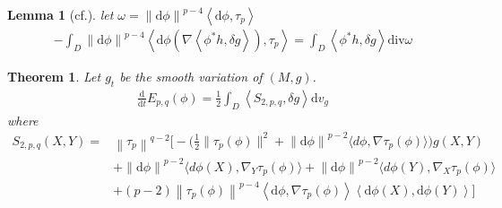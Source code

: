 \documentclass[12pt,UTF8]{article}
\theoremstyle{plain}
\newtheorem{thm}{Theorem}[section]
\newtheorem{lem}{Lemma}
\theoremstyle{definition}
\def\d {\mathrm{d}}
\def\div{\mathrm{div}}
\def\na{\ensuremath{\nabla}}
\renewcommand{\d}[1]{\mathbb{#1}}
\renewcommand{\(}{\left(}
\renewcommand{\)}{\right)}
\newcommand{\norm}[1]{\left\lVert#1\right\rVert}%
\numberwithin{equation}{subsection}
\def\na{\nabla}
\renewcommand{\div}{\mbox{div }}
\renewcommand{\(}{\left(}
\renewcommand{\)}{\right)}
\def\d{\mathrm{d}}
\def \d {\mathrm{d}}
\def \div{\mathrm{div}}
\numberwithin{equation}{section}
\begin{document}
\begin{lem}[cf.\cite{zbMATH06268870}]
	let $\omega=	\norm{\d \phi}^{p-4} \left\langle \d \phi,\tau_p \right\rangle$
	\begin{equation}
		\begin{split}
			-\int_D	\norm{\d \phi}^{p-4} \left\langle  \d \phi (\na \left\langle  \phi^*h,\delta g \right\rangle  ),\tau_p\right\rangle 
			=\int_D \left\langle \phi^*h,\delta g \right\rangle \div \omega
		\end{split}
	\end{equation}
\end{lem}




\begin{thm}Let $g_t$ be the smooth variation of $(M,g)$.
	\begin{equation}
		\begin{split}
			\frac{\d}{\d t}	E_{p,q}(\phi)=\frac{1}{2}\int_D \left\langle S_{2,p,q} , \delta g \right\rangle\d v_g
		\end{split}
	\end{equation}
	where \begin{equation}
		\begin{split}
			S_{2,p,q}(X,Y)=&\norm{\tau_p}^{q-2}\bigg[ -\big(\frac{1}{2}\|\tau_p(\phi)\|^{2}+\norm{\d \phi}^{p-2}\langle d\phi,\na\tau_p(\phi)\rangle\big)g(X,Y)\\
			&+\norm{\d \phi}^{p-2}\langle d\phi(X),\na_Y\tau_p(\phi)\rangle+\norm{\d \phi}^{p-2}\langle d\phi(Y),\na_X\tau_p(\phi)\rangle\\
			&+(p-2)\norm{\tau_p(\phi)}^{p-4}\left\langle \d \phi,\na \tau_p(\phi) \right\rangle\left\langle \d \phi(X),\d \phi(Y) \right\rangle\bigg]
		\end{split}
	\end{equation}
\end{thm}
\end{document}
